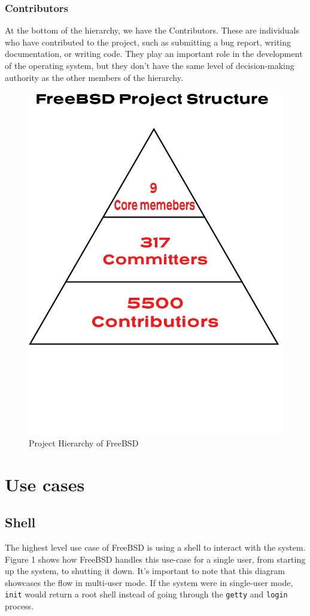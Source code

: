 \documentclass[12pt, dvipsnames, a4paper]{article}
\newcommand{\code}[1]{\texttt{#1}}
\begin{document}
\subsubsection{Contributors}
At the bottom of the hierarchy, we have the Contributors. These are individuals who have contributed to the project, such as submitting a bug report, writing documentation, or writing code. They play an important role in the development of the operating system, but they don't have the same level of decision-making authority as the other members of the hierarchy.
\begin{figure}[!htb]
	\centering
	\includegraphics[width = 350pt]{assets/Project_Hierarchy/Project-Structure.png}
	\caption{Project Hierarchy of FreeBSD\cite{dev-model}}
\end{figure}



\clearpage
\section{Use cases}
\subsection{Shell}
The highest level use case of FreeBSD is using a shell to interact with the system.
Figure 1 shows how FreeBSD handles this use-case for a single user,
from starting up the system, to shutting it down. It's important to note that
this diagram showcases the flow in multi-user mode. If the system were in
single-user mode, \code{init} would return a root shell instead of going through the
\code{getty} and \code{login} process\cite{bootprocess}\cite{init}.
\end{document}
